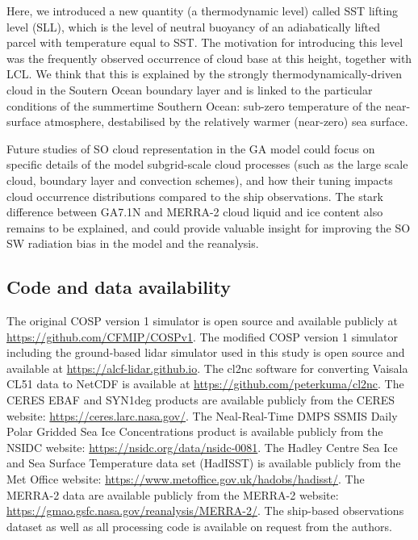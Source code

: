 Here, we introduced a new quantity (a thermodynamic level) called SST lifting
level (SLL), which is the level of neutral buoyancy of an adiabatically lifted
parcel with temperature equal to SST. The motivation for introducing this level
was the frequently observed occurrence of cloud base at this height, together with
LCL. We think that this is explained by the strongly thermodynamically-driven
cloud in the Soutern Ocean boundary layer and is linked to the particular
conditions of the summertime Southern Ocean: sub-zero temperature of the
near-surface atmosphere, destabilised by the relatively warmer (near-zero)
sea surface.

Future studies of SO cloud representation in the GA model could focus on
specific details of the model subgrid-scale cloud processes (such as the large
scale cloud, boundary layer and convection schemes), and how their tuning
impacts cloud occurrence distributions compared to the ship observations. The
stark difference between GA7.1N and MERRA-2 cloud liquid and ice content also
remains to be explained, and could provide valuable insight for improving the
SO SW radiation bias in the model and the reanalysis.

\clearpage

\fontsize{10pt}{12pt}
\sffamily

\subsection*{Code and data availability}

The original COSP version 1 simulator is open source and available publicly at
\url{https://github.com/CFMIP/COSPv1}. The modified COSP version 1 simulator
including the ground-based lidar simulator used in this study is open source and
available at \url{https://alcf-lidar.github.io}. The cl2nc
software for converting Vaisala CL51 data to NetCDF is available at
\url{https://github.com/peterkuma/cl2nc}. The CERES EBAF and SYN1deg products
are available publicly from the CERES website:
\url{https://ceres.larc.nasa.gov/}. The Neal-Real-Time DMPS SSMIS Daily Polar
Gridded Sea Ice Concentrations product is available publicly from the NSIDC
website: \url{https://nsidc.org/data/nsidc-0081}. The Hadley Centre Sea Ice and
Sea Surface Temperature data set (HadISST) is available publicly from the Met
Office website: \url{https://www.metoffice.gov.uk/hadobs/hadisst/}. The MERRA-2
data are available publicly from the MERRA-2 website:
\url{https://gmao.gsfc.nasa.gov/reanalysis/MERRA-2/}. The ship-based
observations dataset as well as all processing code is available on request
from the authors.

